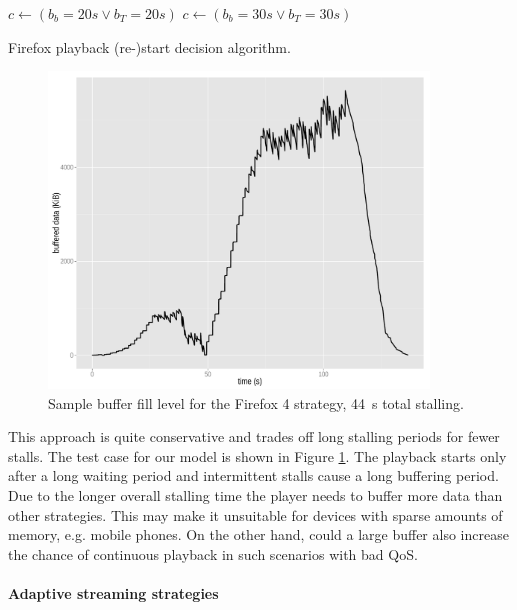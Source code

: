 \begin{algorithm}[htb]
    \centering
    \begin{algorithmic}
          \STATE $c \gets ( b_b=20s \lor b_T=20s )$
        \ELSE
          \STATE $c \gets ( b_b=30s \lor b_T=30s )$
        \ENDIF 
    \end{algorithmic}
    \caption{Firefox playback (re-)start decision algorithm.}
    \label{c3:alg:firefox}
\end{algorithm}

 \begin{figure}[htb]
    \centering
    \includegraphics[width=0.9\textwidth]{images/R-bufferlevel-firefox.pdf}
    \caption{Sample buffer fill level for the Firefox 4 strategy, \SI{44}{\second} total stalling.}
    \label{c3:fig:bufferlevel-firefox}
\end{figure}


This approach is quite conservative and trades off long stalling periods for fewer stalls. The test case for our model is shown in Figure \ref{c3:fig:bufferlevel-firefox}. The playback starts only after a long waiting period and intermittent stalls cause a long buffering period. 
Due to the longer overall stalling time the player needs to buffer more data than other strategies. This may make it unsuitable for devices with sparse amounts of memory, e.g. mobile phones. On the other hand, could a large buffer also increase the chance of continuous playback in such scenarios with bad \gls{QoS}.


\paragraph{Adaptive streaming strategies}

